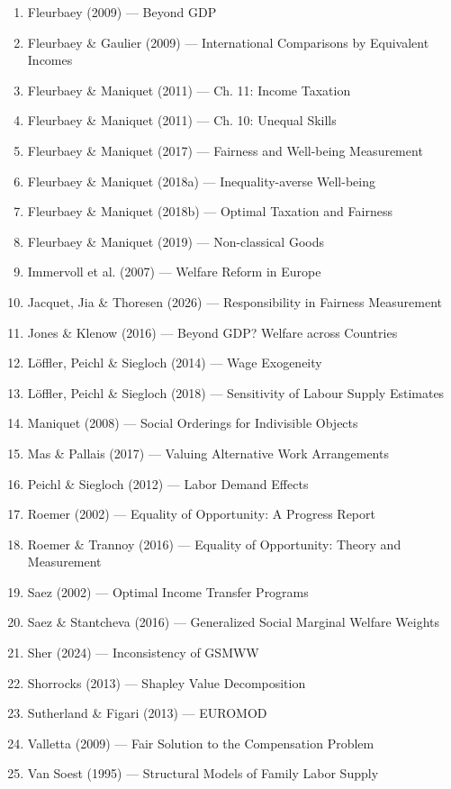 \documentclass[11pt,a4paper]{article}
\begin{document}
\begin{enumerate}
  \item Fleurbaey (2009) — Beyond GDP
  \item Fleurbaey \& Gaulier (2009) — International Comparisons by Equivalent Incomes
  \item Fleurbaey \& Maniquet (2011) — Ch. 11: Income Taxation
  \item Fleurbaey \& Maniquet (2011) — Ch. 10: Unequal Skills
  \item Fleurbaey \& Maniquet (2017) — Fairness and Well-being Measurement
  \item Fleurbaey \& Maniquet (2018a) — Inequality-averse Well-being
  \item Fleurbaey \& Maniquet (2018b) — Optimal Taxation and Fairness
  \item Fleurbaey \& Maniquet (2019) — Non-classical Goods
  \item Immervoll et al. (2007) — Welfare Reform in Europe
  \item Jacquet, Jia \& Thoresen (2026) — Responsibility in Fairness Measurement
  \item Jones \& Klenow (2016) — Beyond GDP? Welfare across Countries
  \item Löffler, Peichl \& Siegloch (2014) — Wage Exogeneity
  \item Löffler, Peichl \& Siegloch (2018) — Sensitivity of Labour Supply Estimates
  \item Maniquet (2008) — Social Orderings for Indivisible Objects
  \item Mas \& Pallais (2017) — Valuing Alternative Work Arrangements
  \item Peichl \& Siegloch (2012) — Labor Demand Effects
  \item Roemer (2002) — Equality of Opportunity: A Progress Report
  \item Roemer \& Trannoy (2016) — Equality of Opportunity: Theory and Measurement
  \item Saez (2002) — Optimal Income Transfer Programs
  \item Saez \& Stantcheva (2016) — Generalized Social Marginal Welfare Weights
  \item Sher (2024) — Inconsistency of GSMWW
  \item Shorrocks (2013) — Shapley Value Decomposition
  \item Sutherland \& Figari (2013) — EUROMOD
  \item Valletta (2009) — Fair Solution to the Compensation Problem
  \item Van Soest (1995) — Structural Models of Family Labor Supply
\end{enumerate}
\end{document}
